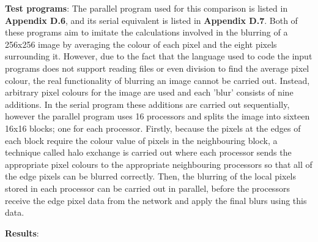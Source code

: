 \documentclass[a4paper, 12pt]{article}
\begin{document}
\noindent\textbf{Test programs}: The parallel program used for this comparison is listed in \textbf{Appendix D.6}, and its serial equivalent is listed in \textbf{Appendix D.7}. Both of these programs aim to imitate the calculations involved in the blurring of a 256x256 image by averaging the colour of each pixel and the eight pixels surrounding it. However, due to the fact that the language used to code the input programs does not support reading files or even division to find the average pixel colour, the real functionality of blurring an image cannot be carried out. Instead, arbitrary pixel colours for the image are used and each 'blur' consists of nine additions. In the serial program these additions are carried out sequentially, however the parallel program uses 16 processors and splits the image into sixteen 16x16 blocks; one for each processor. Firstly, because the pixels at the edges of each block require the colour value of pixels in the neighbouring block, a technique called halo exchange is carried out where each processor sends the appropriate pixel colours to the appropriate neighbouring processors so that all of the edge pixels can be blurred correctly. Then, the blurring of the local pixels stored in each processor can be carried out in parallel, before the processors receive the edge pixel data from the network and apply the final blurs using this data.

\noindent\textbf{Results}:
\end{document}
